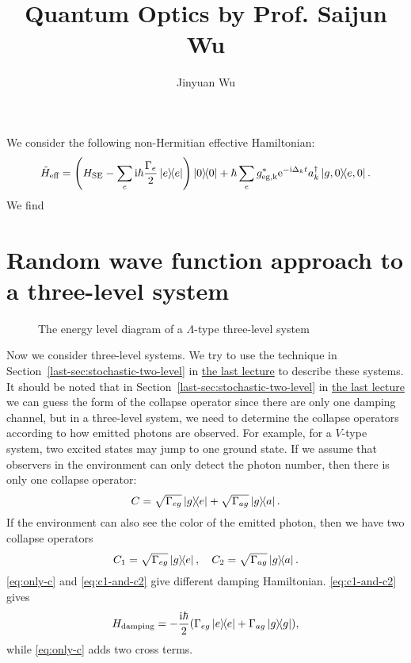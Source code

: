 \documentclass[hyperref, a4paper]{article}
\title{Quantum Optics by Prof. Saijun Wu}
\author{Jinyuan Wu}
\newcommand*{\ii}{\mathrm{i}}
\newcommand*{\ee}{\mathrm{e}}
\newcommand{\lastnote}{\href{12-2.pdf}{the last lecture}}
\begin{document}
\maketitle

We consider the following non-Hermitian effective Hamiltonian:
\begin{equation}
    \tilde{H}_\text{eff} = \left( H_\text{SE} - \sum_e \ii \hbar \frac{\Gamma_e}{2} \dyad{e}  \right) \dyad{0}
    + \hbar \sum_{e} g^*_\text{eg,k} \ee^{- \ii \Delta_k t} a_k^\dagger \dyad{g, 0}{e, 0} .
\end{equation}
We find 

\section{Random wave function approach to a three-level system}

\begin{figure}
    \centering
    
    \caption{The energy level diagram of a $\Lambda$-type three-level system}
    \label{fig:lambda-system}
\end{figure}

Now we consider three-level systems.
We try to use the technique in Section~\ref{last-sec:stochastic-two-level} in \lastnote{} to describe 
these systems. It should be noted that in Section~\ref{last-sec:stochastic-two-level} in \lastnote{} we
can guess the form of the collapse operator since there are only one damping channel, but in a three-level 
system, we need to determine the collapse operators according to how emitted photons are observed. 
For example, for a $V$-type system, two excited states may jump to one ground state. If we assume that 
observers in the environment can only detect the photon number, then there is only one collapse operator:
\begin{equation}
    C = \sqrt{\Gamma_{eg}} \dyad{g}{e} + \sqrt{\Gamma_{ag}} \dyad{g}{a}.
    \label{eq:only-c}
\end{equation}
If the environment can also see the color of the emitted photon, then we have two collapse operators
\begin{equation}
    C_1 = \sqrt{\Gamma_{eg}} \dyad{g}{e}, \quad C_2 = \sqrt{\Gamma_{ag}} \dyad{g}{a}.
    \label{eq:c1-and-c2}
\end{equation}
\eqref{eq:only-c} and \eqref{eq:c1-and-c2} give different damping Hamiltonian. \eqref{eq:c1-and-c2} gives
\begin{equation}
    H_\text{damping} = - \frac{\ii \hbar}{2} (\Gamma_{eg} \dyad{e} + \Gamma_{ag} \dyad{g}),
\end{equation} 
while \eqref{eq:only-c} adds two cross terms.
\end{document}
